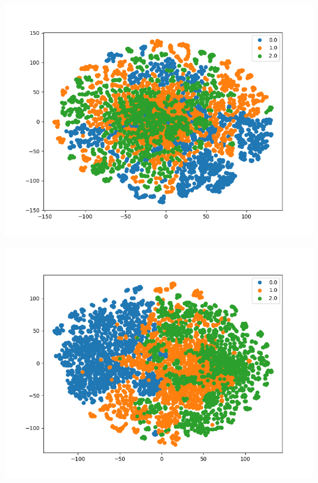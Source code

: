 \documentclass[11pt]{article}
\begin{document}
\begin{center}
\begin{minipage}{0.3\linewidth}
    \end{minipage}
\end{center}

\begin{center}
    \begin{minipage}{0.3\linewidth}
    \includegraphics[width=\linewidth]{TMWDL-TSNE-0.png}
    \end{minipage}
    \begin{minipage}{0.3\linewidth}
    \includegraphics[width=\linewidth]{TMWDL-TSNE-15.png}
    \end{minipage}
    \begin{minipage}{0.3\linewidth}

\end{minipage}
\end{center}
\end{document}
